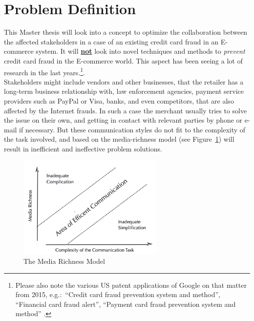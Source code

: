 
\section{Problem Definition}
\label{sec:problem_definition}

This Master thesis will look into a concept to optimize the collaboration between the affected stakeholders in a case of an existing credit card fraud in an \gls{E-commerce} system. It will \textbf{\underline{not}} look into novel techniques and methods to \textit{prevent} credit card fraud in the \gls{E-commerce} world. This aspect has been seeing a lot of research in the last years.\footnote{Please also note the various US patent applications of Google on that matter from 2015, e.g.:\ “Credit card fraud prevention system and method”, “Financial card fraud alert”, “Payment card fraud prevention system and method” \citep{GooglePatents2015}.}. \\

Stakeholders might include vendors and other businesses, that the retailer has a long-term business relationship with, law enforcement agencies, payment service providers such as PayPal or Visa, banks, and even competitors, that are also affected by the Internet frauds. In such a case the merchant usually tries to solve the issue on their own, and getting in contact with relevant parties by phone or e-mail if necessary. But these communication styles do not fit to the complexity of the task involved, and based on the media-richness model (see Figure~\ref{fig:images_media_richness_model}) will result in inefficient and ineffective problem solutions. \\

\begin{figure}[!ht]
	\centering
		\includegraphics[height=2in]{images/media-richness-model.png}
	\caption[The Media Richness Model]{The Media Richness Model \citep{Rice1992}}
\label{fig:images_media_richness_model}
\end{figure}

